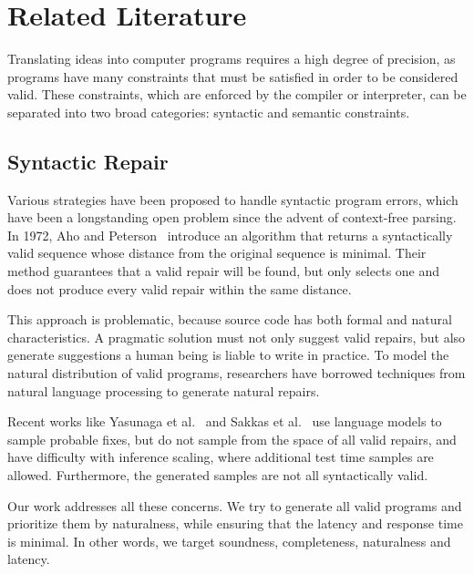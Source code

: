\chapter{\rm\bfseries Related Literature}
\label{ch:litreview}

Translating ideas into computer programs requires a high degree of precision, as programs have many constraints that must be satisfied in order to be considered valid. These constraints, which are enforced by the compiler or interpreter, can be separated into two broad categories: syntactic and semantic constraints.

\section{Syntactic Repair}

Various strategies have been proposed to handle syntactic program errors, which have been a longstanding open problem since the advent of context-free parsing. In 1972, Aho and Peterson~\cite{aho1972minimum} introduce an algorithm that returns a syntactically valid sequence whose distance from the original sequence is minimal. Their method guarantees that a valid repair will be found, but only selects one and does not produce every valid repair within the same distance.

This approach is problematic, because source code has both formal and natural characteristics. A pragmatic solution must not only suggest valid repairs, but also generate suggestions a human being is liable to write in practice. To model the natural distribution of valid programs, researchers have borrowed techniques from natural language processing to generate natural repairs.

Recent works like Yasunaga et al.~\cite{yasunaga2021break} and Sakkas et al.~\cite{sakkas2022seq2parse} use language models to sample probable fixes, but do not sample from the space of all valid repairs, and have difficulty with inference scaling, where additional test time samples are allowed. Furthermore, the generated samples are not all syntactically valid.

Our work addresses all these concerns. We try to generate all valid programs and prioritize them by naturalness, while ensuring that the latency and response time is minimal. In other words, we target soundness, completeness, naturalness and latency.


\clearpage